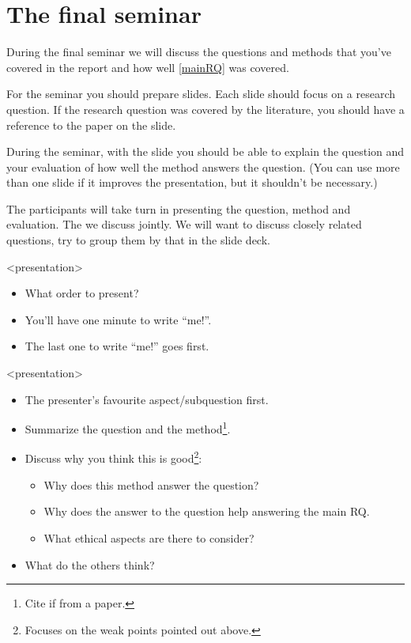 \section{The final seminar}

During the final seminar we will discuss the questions and methods that you've 
covered in the report and how well \cref{mainRQ} was covered.

For the seminar you should prepare slides.
Each slide should focus on a research question.
If the research question was covered by the literature, you should have a 
reference to the paper on the slide.

During the seminar, with the slide you should be able to explain the question 
and your evaluation of how well the method answers the question.
(You can use more than one slide if it improves the presentation, but it 
shouldn't be necessary.)

The participants will take turn in presenting the question, method and 
evaluation.
The we discuss jointly.
We will want to discuss closely related questions, try to group them by that in 
the slide deck.

\begin{frame}<presentation>
  \begin{activity}[Order]
    \begin{itemize}
      \item What order to present?
      \item You'll have one minute to write \enquote{me!}.
      \item The last one to write \enquote{me!} goes first.
    \end{itemize}
  \end{activity}
\end{frame}

\begin{frame}<presentation>
  \mainRQ*
  \begin{activity}
    \begin{itemize}
      \item The presenter's favourite aspect/subquestion first.
      \item Summarize the question and the method\footnote{%
          Cite if from a paper.
        }.
      \item Discuss why you think this is good\footnote{%
          Focuses on the weak points pointed out above.
        }:
        \begin{itemize}
          \item Why does this method answer the question?
          \item Why does the answer to the question help answering the main RQ.
          \item What ethical aspects are there to consider?
        \end{itemize}
      \item What do the others think?
    \end{itemize}
  \end{activity}
\end{frame}
